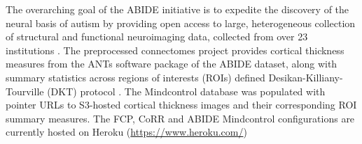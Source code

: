 The overarching goal of the ABIDE initiative is to expedite the discovery of the neural basis of autism by providing open access to large, heterogeneous collection of structural and functional neuroimaging data, collected from over 23 institutions \cite{Di_Martino_2013}. The preprocessed connectomes project provides cortical thickness measures from the ANTs software package \cite{avants2009advanced} of the ABIDE dataset, along with summary statistics across regions of interests (ROIs) defined Desikan-Killiany-Tourville (DKT) protocol \cite{Klein_2012}. The Mindcontrol database was populated with pointer URLs to S3-hosted cortical thickness images and their corresponding ROI summary measures. The FCP, CoRR and ABIDE Mindcontrol configurations are currently hosted on Heroku (\href{http://www.heroku.com/}{https://www.heroku.com/})

